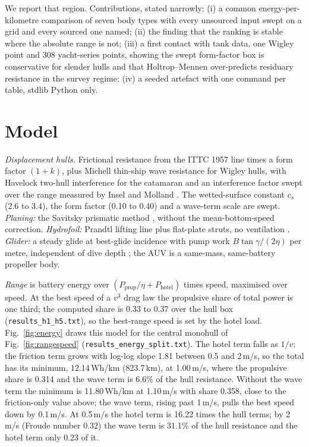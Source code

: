 \documentclass[conference]{IEEEtran}
\begin{document}
We report that region. Contributions, stated narrowly: (i) a common energy-per-kilometre
comparison of seven body types with every unsourced input swept on a grid and every sourced one
named; (ii) the finding that the ranking is stable where the absolute range is not; (iii) a first
contact with tank data, one Wigley point and 308 yacht-series points, showing the swept form-factor
box is conservative for slender hulls and that Holtrop--Mennen over-predicts residuary resistance in
the survey regime; (iv) a seeded artefact with one command per table, stdlib Python only.

\section{Model}
\emph{Displacement hulls.} Frictional resistance from the ITTC 1957 line \cite{ittc1957} times a
form factor $(1+k)$, plus Michell thin-ship wave resistance \cite{michell1898} for Wigley hulls,
with Havelock two-hull interference for the catamaran and an interference factor swept over the
range measured by Insel and Molland \cite{insel1992,molland2011}. The wetted-surface constant
$c_s$ (2.6 to 3.4), the form factor (0.10 to 0.40) and a wave-term scale are swept.
\emph{Planing:} the Savitsky prismatic method \cite{savitsky1964}, without the mean-bottom-speed
correction. \emph{Hydrofoil:} Prandtl lifting line plus flat-plate struts, no ventilation
\cite{faltinsen2005}. \emph{Glider:} a steady glide at best-glide incidence with pump work
$B\tan\gamma/(2\eta)$ per metre, independent of dive depth \cite{rudnick2004,eriksen2001}; the AUV
is a same-mass, same-battery propeller body.

\emph{Range} is battery energy over $(P_{\mathrm{prop}}/\eta + P_{\mathrm{hotel}})$ times speed,
maximised over speed. At the best speed of a $v^3$ drag law the propulsive share of total power
is one third; the computed share is 0.33 to 0.37 over the hull box
(\texttt{results\_h1\_h5.txt}), so the best-range speed is set by the hotel load.
Fig.~\ref{fig:energy} draws this model for the central monohull of Fig.~\ref{fig:rangespeed}
(\texttt{results\_energy\_split.txt}). The hotel term falls as $1/v$; the friction term grows with
log-log slope 1.81 between 0.5 and 2\,m/s, so the total has its minimum, 12.14\,Wh/km (823.7\,km), at
1.00\,m/s, where the propulsive share is 0.314 and the wave term is 6.6\% of the hull resistance.
Without the wave term the minimum is 11.80\,Wh/km at 1.10\,m/s with share 0.358, close to the friction-only
value above; the wave term, rising past 1\,m/s, pulls the best speed down by 0.1\,m/s. At 0.5\,m/s the hotel term is 16.22 times
the hull terms; by 2\,m/s (Froude number 0.32) the wave term is 31.1\% of the hull resistance and the
hotel term only 0.23 of it.
\end{document}
